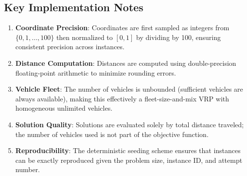 \documentclass[a4paper,twoside]{article}
\begin{document}
\subsection{Key Implementation Notes}

\begin{enumerate}
    \item \textbf{Coordinate Precision}: Coordinates are first sampled as integers from $\{0, 1, \ldots, 100\}$ then normalized to $[0, 1]$ by dividing by 100, ensuring consistent precision across instances.
    
    \item \textbf{Distance Computation}: Distances are computed using double-precision floating-point arithmetic to minimize rounding errors.
    
    \item \textbf{Vehicle Fleet}: The number of vehicles is unbounded (sufficient vehicles are always available), making this effectively a fleet-size-and-mix VRP with homogeneous unlimited vehicles.
    
    \item \textbf{Solution Quality}: Solutions are evaluated solely by total distance traveled; the number of vehicles used is not part of the objective function.
    
    \item \textbf{Reproducibility}: The deterministic seeding scheme ensures that instances can be exactly reproduced given the problem size, instance ID, and attempt number.
\end{enumerate}

\end{document}
